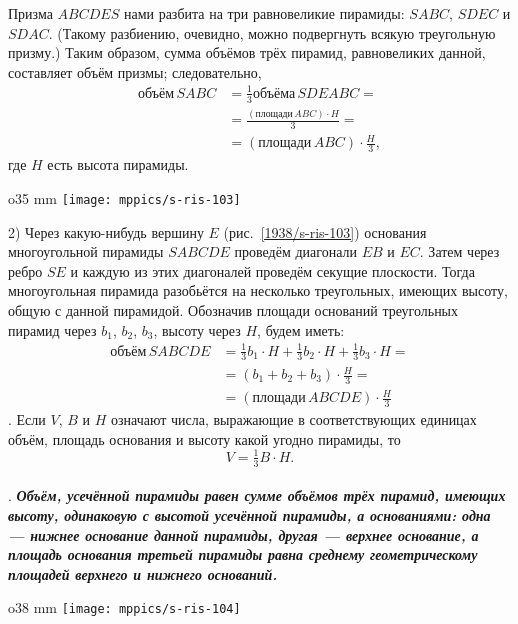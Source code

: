 Призма $ABCDES$ нами разбита на три равновеликие пирамиды: $SABC$, $SDEC$ и $SDAC$.
(Такому разбиению, очевидно, можно подвергнуть всякую треугольную призму.) Таким образом, сумма объёмов трёх пирамид, равновеликих данной, составляет объём призмы;
следовательно,
\begin{align*}
\text{объём}\,SABC &= \tfrac13 \text{объёма}\, SDEABC =
\\
&=\frac{(\text{площади}\,ABC)\cdot H}3=
\\
&=(\text{площади}\,ABC)\cdot \frac{H}3,
\end{align*}
где $H$ есть высота пирамиды.

\begin{wrapfigure}{o}{35 mm}
\vskip-8mm
\centering
\texttt{[image: mppics/s-ris-103]}
\caption{}\label{1938/s-ris-103}
\vskip-0mm
\end{wrapfigure}

2) Через какую-нибудь вершину $E$ (рис.~\ref{1938/s-ris-103}) основания многоугольной пирамиды $SABCDE$ проведём диагонали $EB$ и $EC$.
Затем через ребро $SE$ и каждую из этих диагоналей проведём секущие плоскости.
Тогда многоугольная пирамида разобьётся на несколько треугольных, имеющих высоту, общую с данной пирамидой.
Обозначив площади оснований треугольных пирамид через $b_1$, $b_2$, $b_3$, высоту через $H$, будем иметь:
\begin{align*}
\text{объём}\,SABCDE &= \tfrac13b_1\cdot H + \tfrac13b_2\cdot H + \tfrac13b_3 \cdot H =
\\
&=(b_1+b_2+b_3)\cdot \frac H3=
\\
&=(\text{площади}\,ABCDE)\cdot \frac H3
\end{align*}
.
Если $V$, $B$ и $H$ означают числа, выражающие в соответствующих единицах объём, площадь основания и высоту какой угодно пирамиды, то
\[V = \tfrac13 B\cdot H.\]

\paragraph{}\label{1938/s92}
.
\textbf{\emph{Объём, усечённой пирамиды равен сумме объёмов трёх пирамид, имеющих высоту, одинаковую с высотой усечённой пирамиды, а основаниями: одна — нижнее основание данной пирамиды, другая — верхнее основание, а площадь основания третьей пирамиды равна среднему геометрическому площадей верхнего и нижнего оснований.}}

\begin{wrapfigure}{o}{38 mm}
\vskip-0mm
\centering
\texttt{[image: mppics/s-ris-104]}
\caption{}\label{1938/s-ris-104}
\vskip-0mm
\end{wrapfigure}

